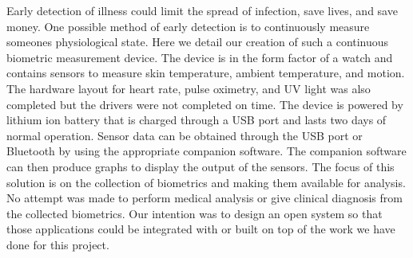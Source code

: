 Early detection of illness could limit the spread of infection, save lives, and
save money.  One possible method of early detection is to continuously measure
someones physiological state.  Here we detail our creation of such a continuous
biometric measurement device.  The device is in the form factor of a watch and
contains sensors to measure skin temperature, ambient temperature, and motion.  
The hardware layout for heart rate, pulse oximetry, and UV light was also completed
but the drivers were not completed on time.
The device is powered by lithium ion battery that is charged
through a USB port and lasts two days of normal operation.  Sensor data can be
obtained through the USB port or Bluetooth by using the appropriate companion
software.  The companion software can then produce graphs to display the output
of the sensors.  The focus of this solution is on the collection of biometrics
and making them available for analysis.  No attempt was made to perform medical
analysis or give clinical diagnosis from the collected biometrics.  Our
intention was to design an open system so that those applications could be
integrated with or built on top of the work we have done for this project.
